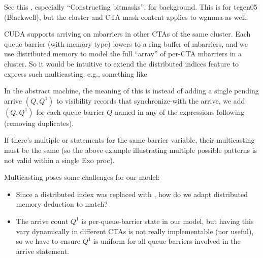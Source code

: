 \newpage
{}
\label{ch:Multicasting}

See this , especially ``Constructing bitmasks'', for background.
This is for tcgen05 (Blackwell), but the cluster and CTA mask content applies to wgmma as well.

\filbreak
CUDA supports arriving on mbarriers in other CTAs of the same cluster.
Each queue barrier (with  memory type) lowers to a ring buffer of mbarriers, and we use distributed memory to model the full ``array'' of per-CTA mbarriers in a cluster.
So it would be intuitive to extend the distributed indices feature to express such multicasting, e.g., something like

\filbreak


\filbreak
In the abstract machine, the meaning of this is instead of adding a single pending arrive $(Q, Q^1)$ to visibility records that synchronize-with the arrive, we add $(Q, Q^1)$ for each queue barrier $Q$ named in any of the expressions following \lighttt{>>} (removing duplicates).

\filbreak
If there's multiple  or  statements for the same barrier variable, their multicasting must be the same (so the above example illustrating multiple possible patterns is not valid within a single Exo proc).

Multicasting poses some challenges for our model:
\begin{itemize}
\item Since a distributed index was replaced with \lighttt{:}, how do we adapt distributed memory deduction to match?
\filbreak
\item The arrive count $Q^1$ is per-queue-barrier state in our model, but having this vary dynamically in different CTAs is not really implementable (nor useful), so we have to ensure $Q^1$ is uniform for all queue barriers involved in the arrive statement.
\end{itemize}

